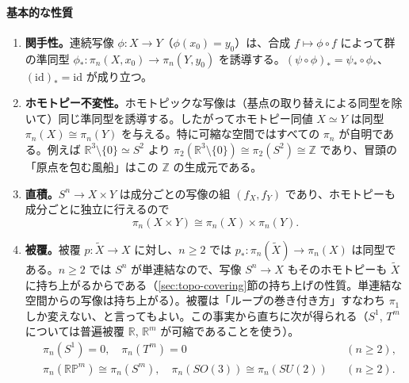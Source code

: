 \documentclass[uplatex, dvipdfmx, book]{jsbook}
\begin{document}
\paragraph{基本的な性質}
\begin{enumerate}
    \item \textbf{関手性。}連続写像 $\phi: X \to Y$（$\phi(x_0) = y_0$）は、合成 $f \mapsto \phi \circ f$ によって群の準同型 $\phi_*: \pi_n(X, x_0) \to \pi_n(Y, y_0)$ を誘導する。$(\psi \circ \phi)_* = \psi_* \circ \phi_*$、$(\mathrm{id})_* = \mathrm{id}$ が成り立つ。
    \item \textbf{ホモトピー不変性。}ホモトピックな写像は（基点の取り替えによる同型を除いて）同じ準同型を誘導する。したがってホモトピー同値 $X \simeq Y$ は同型 $\pi_n(X) \cong \pi_n(Y)$ を与える。特に可縮な空間ではすべての $\pi_n$ が自明である。例えば $\mathbb{R}^3 \setminus \{0\} \simeq S^2$ より $\pi_2(\mathbb{R}^3 \setminus \{0\}) \cong \pi_2(S^2) \cong \mathbb{Z}$ であり、冒頭の「原点を包む風船」はこの $\mathbb{Z}$ の生成元である。
    \item \textbf{直積。}$S^n \to X \times Y$ は成分ごとの写像の組 $(f_X, f_Y)$ であり、ホモトピーも成分ごとに独立に行えるので
    \begin{equation}
        \pi_n(X \times Y) \cong \pi_n(X) \times \pi_n(Y).
    \end{equation}
    \item \textbf{被覆。}被覆 $p: \tilde{X} \to X$ に対し、$n \ge 2$ では $p_*: \pi_n(\tilde{X}) \to \pi_n(X)$ は同型である。$n \ge 2$ では $S^n$ が単連結なので、写像 $S^n \to X$ もそのホモトピーも $\tilde{X}$ に持ち上がるからである（\ref{sec:topo-covering}節の持ち上げの性質。単連結な空間からの写像は持ち上がる）。被覆は「ループの巻き付き方」すなわち $\pi_1$ しか変えない、と言ってもよい。この事実から直ちに次が得られる（$S^1$, $T^m$ については普遍被覆 $\mathbb{R}$, $\mathbb{R}^m$ が可縮であることを使う）。
    \begin{equation}
        \begin{aligned}
            &\pi_n(S^1) = 0,\quad \pi_n(T^m) = 0 && (n \ge 2), \\
            &\pi_n(\mathbb{RP}^m) \cong \pi_n(S^m),\quad \pi_n(SO(3)) \cong \pi_n(SU(2)) && (n \ge 2).
        \end{aligned}
        \label{eq:pin-covering}
    \end{equation}
\end{enumerate}
\end{document}
